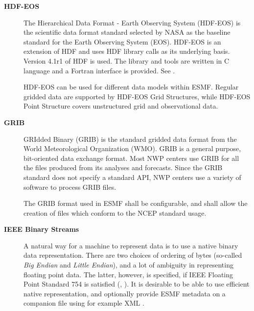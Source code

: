 \begin{description}
\item[\bf HDF-EOS]  The Hierarchical Data Format - Earth Observing
System (HDF-EOS) is the scientific data format standard selected by
NASA as the baseline standard for the Earth Observing System (EOS). HDF-EOS
is an extension of HDF and uses HDF library calls as its underlying
basis. Version 4.1r1 of HDF is used. The library and tools are written
in C language and a Fortran interface is provided. See \cite{HDF-EOS}.

HDF-EOS can be used for different data models within ESMF. Regular
gridded data are supported by HDF-EOS Grid Structures, while HDF-EOS  
Point Structure covers unstructured grid and observational data.


\item[\bf GRIB] 
GRIdded Binary (GRIB) is the standard gridded data format from the
World Meteorological Organization (WMO).  GRIB is a general purpose,
bit-oriented data exchange format. Most NWP centers use GRIB for all the 
files produced from its analyses and forecasts. Since the GRIB standard does 
not specify a standard API, NWP centers use a variety of software to process 
GRIB files.

The GRIB format used in ESMF shall be configurable, and shall allow the 
creation of files which conform to the NCEP standard usage.  

\item[\bf IEEE Binary Streams]
A natural way for a machine to represent data is to use a native
binary data representation. There are two choices of ordering of bytes
(so-called {\it Big Endian} and {\it Little Endian}), and a lot of
ambiguity in representing floating point data. The latter, however, is
specified, if IEEE Floating Point Standard 754 is satisfied
(\cite{IEEE-Floating-Point}, \cite{Kahan-IEEE-754}). It is desirable
to be able to use efficient native representation, and optionally
provide ESMF metadata on a companion file using for example XML
\cite{XML-W3C}.


\end{description}
